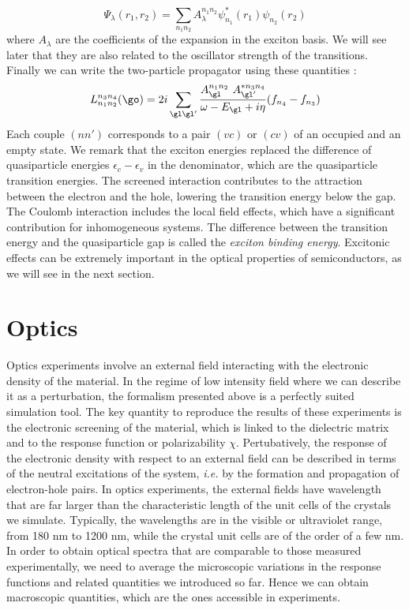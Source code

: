 \begin{equation}
	\Psi_\lambda(r_1, r_2) = \sum_{n_1 n_2} A_\lambda^{n_1n_2} \psi_{n_1}^* (r_1) \psi_{n_2} (r_2)
\end{equation}
where $A_\lambda$ are the coefficients of the expansion in the exciton basis. We will see later that they are also related to the oscillator strength of the transitions. Finally we can write the two-particle propagator using these quantities :
\begin{equation}
	L^{n_3n_4}_{n_1n_2}(\go) = 2i \sum_{\gl\gl'}\frac{A^{n_1n_2}_\gl \ A^{*n_3n_4}_{\gl'}}{\omega - E_\gl + i\eta} (f_{n_4} - f_{n_3})
\end{equation}
Each couple $(nn')$ corresponds to a pair $(vc)$ or $(cv)$ of an occupied and an empty state. We remark that the exciton energies replaced the difference of quasiparticle energies $\epsilon_c - \epsilon_v$ in the denominator, which are the quasiparticle transition energies. The screened interaction contributes to the attraction between the electron and the hole, lowering the transition energy below the gap. The Coulomb interaction includes the local field effects, which have a significant contribution for inhomogeneous systems. The difference between the transition energy and the quasiparticle gap is called the \textit{exciton binding energy}. Excitonic effects can be extremely important in the optical properties of semiconductors, as we will see in the next section.
%

%
\section{Optics}
Optics experiments involve an external field interacting with the electronic density of the material. In the regime of low intensity field where we can describe it as a perturbation, the formalism presented above is a perfectly suited simulation tool. The key quantity to reproduce the results of these experiments is the electronic screening of the material, which is linked to the dielectric matrix and to the response function or polarizability $\chi$. Pertubatively, the response of the electronic density with respect to an external field can be described in terms of the neutral excitations of the system, \textit{i.e.} by the formation and propagation of electron-hole pairs.
In optics experiments, the external fields have wavelength that are far larger than the characteristic length of the unit cells of the crystals we simulate. Typically, the wavelengths are in the visible or ultraviolet range, from 180 nm to 1200 nm, while the crystal unit cells are of the order of a few nm. 
In order to obtain optical spectra that are comparable to those measured experimentally, we need to average the microscopic variations in the response functions and related quantities we introduced so far. Hence we can obtain macroscopic quantities, which are the ones accessible in experiments. 

